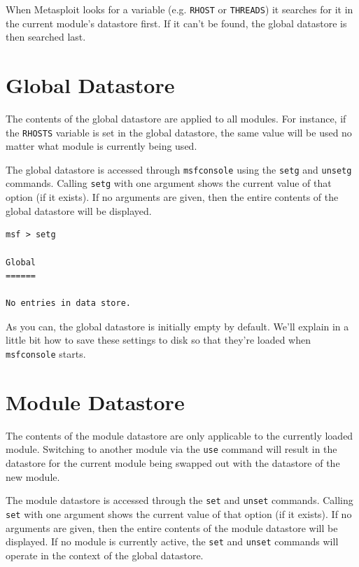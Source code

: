 \documentclass{report}
\begin{document}
\par
When Metasploit looks for a variable (e.g. \texttt{RHOST} or \texttt{THREADS})
it searches for it in the current module's datastore first. If it can't be found, 
the global datastore is then searched last.

    \section{Global Datastore}
    \label{ENV-GLOBAL}

\par
The contents of the global datastore are applied to all modules. For instance,
if the \texttt{RHOSTS} variable is set in the global datastore, the same value
will be used no matter what module is currently being used.

\par
The global datastore is accessed through \texttt{msfconsole} using the
\texttt{setg} and \texttt{unsetg} commands. Calling \texttt{setg} with one
argument shows the current value of that option (if it exists). If no arguments
are given, then the entire contents of the global datastore will be displayed.

\begin{verbatim}
msf > setg

Global
======

No entries in data store.

\end{verbatim}

\par
As you can, the global datastore is initially empty by default. We'll explain
in a little bit how to save these settings to disk so that they're loaded when
\texttt{msfconsole} starts.

    \section{Module Datastore}
    \label{ENV-TEMP}

\par
The contents of the module datastore are only applicable to the currently loaded
module. Switching to another module via the \texttt{use} command will result in
the datastore for the current module being swapped out with the datastore of the
new module.

\par
The module datastore is accessed through the \texttt{set} and \texttt{unset}
commands. Calling \texttt{set} with one argument shows the current value of that
option (if it exists). If no arguments are given, then the entire contents of
the module datastore will be displayed. If no module is currently active, the
\texttt{set} and \texttt{unset} commands will operate in the context of the
global datastore.
\end{document}
